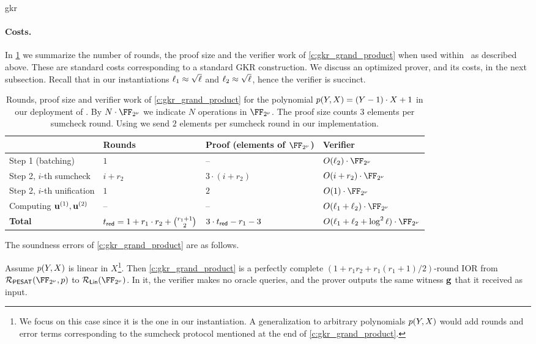 \begin{lncsappendix}{gkr}
\paragraph{Costs.} In \cref{t:gkr_grand_product_complexity} we summarize the number of rounds, the proof size and the verifier work of \cref{c:gkr_grand_product} when used within \ftwoz \ as described above.  These are standard costs corresponding to a standard GKR construction. We discuss an optimized prover, and its costs, in the next subsection. Recall that in our instantiations $\ell_1\approx \sqrt{\ell}$ and $\ell_2\approx\sqrt{\ell}$, hence the verifier is succinct.

\begin{table}[H]
  \centering
  \small
  \begin{tabular}{l|l|l|l}
    \toprule
     & Rounds & Proof (elements of $\comfield$) & Verifier \\
    \hline
    Step 1 (batching) & $1$ & -- & $O(\codedim_2)\cdot \comfield$ \\
    \hline
    Step 2, $i$-th sumcheck & $i+r_2$ & $3\cdot (i+r_2)$ & $O(i+r_2)\cdot \comfield$ \\
    \hline
    Step 2, $i$-th  unification & $1$ & $2$ & $O(1)\cdot \comfield$ \\
    \hline
    Computing $\mathbf{u}^{(1)}, \mathbf{u}^{(2)}$ & --    & -- & $O(\codedim_1 + \codedim_2)\cdot \comfield$\\
    \hline
    \textbf{Total} & $t_{\mathsf{red}} = 1 + r_1\cdot r_2 + \binom{r_1+1}{2}$ & $3\cdot t_{\mathsf{red}} - r_1 - 3$ & $O(\codedim_1 + \codedim_2 + \log^2 \codedim)\cdot \comfield$ \\
    \bottomrule
  \end{tabular}
  \caption{ Rounds, proof size and verifier work of \cref{c:gkr_grand_product} for the polynomial $p(Y,X)=(Y-1)\cdot X +1$ in our deployment of \ftwoz.  By $N\cdot \comfield$ we indicate $N$ operations in $\comfield$. The proof size counts $3$ elements per sumcheck round. Using  \cite{gruen} we send $2$ elements per sumcheck round in our implementation.}
  \label{t:gkr_grand_product_complexity}
\end{table}


The soundness errors of \cref{c:gkr_grand_product} are as follows.

\begin{lemma}\label{l:gkr_grand_product}
 Assume $p(Y,X)$ is linear in $X$\footnote{We focus on this case since it is the one in our instantiation. A generalization to arbitrary polynomials $p(Y,X)$ would  add rounds  and error terms corresponding to the sumcheck protocol mentioned at the end of \cref{c:gkr_grand_product}.}. Then \cref{c:gkr_grand_product} is a perfectly complete
$(1 + r_1 r_2 + r_1(r_1+1)/2)$-round IOR from $\PESAT(\comfield,\gkrpol)$ to $\LIN(\comfield)$. In it, the verifier makes no oracle queries, and the prover outputs the same witness $\mathbf{g}$ that it received as input.


\end{lemma}
\end{lncsappendix}

